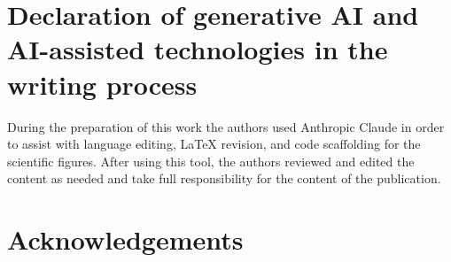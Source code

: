 \documentclass[review,12pt]{elsarticle}
\begin{document}
\section*{Declaration of generative AI and AI-assisted technologies in the writing process}
During the preparation of this work the authors used Anthropic Claude in
order to assist with language editing, \LaTeX{} revision, and code
scaffolding for the scientific figures. After using this tool, the authors
reviewed and edited the content as needed and take full responsibility for
the content of the publication.

\section*{Acknowledgements}



\end{document}
